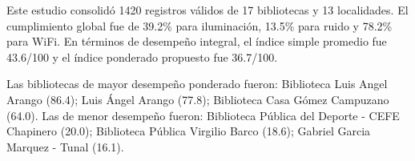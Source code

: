 Este estudio consolidó 1420 registros válidos de 17 bibliotecas y 13 localidades. El cumplimiento global fue de 39.2\% para iluminación, 13.5\% para ruido y 78.2\% para WiFi. En términos de desempeño integral, el índice simple promedio fue 43.6/100 y el índice ponderado propuesto fue 36.7/100.

Las bibliotecas de mayor desempeño ponderado fueron: Biblioteca Luis Angel Arango (86.4); Luis Ángel Arango (77.8); Biblioteca Casa Gómez Campuzano (64.0). Las de menor desempeño fueron: Biblioteca Pública del Deporte - CEFE Chapinero (20.0); Biblioteca Pública Virgilio Barco (18.6); Gabriel Garcia Marquez - Tunal (16.1).

